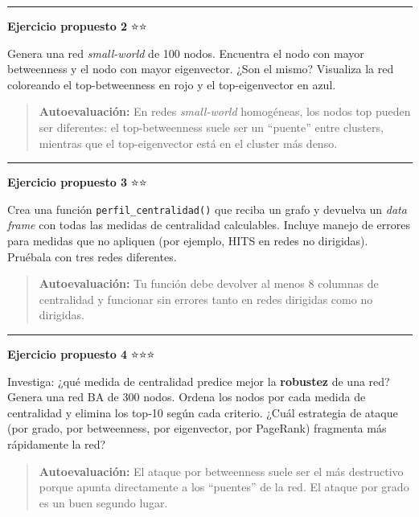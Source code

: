 \documentclass[
  letterpaper,
  DIV=11,
  numbers=noendperiod]{scrreprt}
\begin{document}
\begin{center}\rule{0.5\linewidth}{0.5pt}\end{center}

\textbf{Ejercicio propuesto 2} ⭐⭐

Genera una red \emph{small-world} de 100 nodos. Encuentra el nodo con
mayor betweenness y el nodo con mayor eigenvector. ¿Son el mismo?
Visualiza la red coloreando el top-betweenness en rojo y el
top-eigenvector en azul.

\begin{quote}
\textbf{Autoevaluación:} En redes \emph{small-world} homogéneas, los
nodos top pueden ser diferentes: el top-betweenness suele ser un
``puente'' entre clusters, mientras que el top-eigenvector está en el
cluster más denso.
\end{quote}

\begin{center}\rule{0.5\linewidth}{0.5pt}\end{center}

\textbf{Ejercicio propuesto 3} ⭐⭐

Crea una función \texttt{perfil\_centralidad()} que reciba un grafo y
devuelva un \emph{data frame} con todas las medidas de centralidad
calculables. Incluye manejo de errores para medidas que no apliquen (por
ejemplo, HITS en redes no dirigidas). Pruébala con tres redes
diferentes.

\begin{quote}
\textbf{Autoevaluación:} Tu función debe devolver al menos 8 columnas de
centralidad y funcionar sin errores tanto en redes dirigidas como no
dirigidas.
\end{quote}

\begin{center}\rule{0.5\linewidth}{0.5pt}\end{center}

\textbf{Ejercicio propuesto 4} ⭐⭐⭐

Investiga: ¿qué medida de centralidad predice mejor la \textbf{robustez}
de una red? Genera una red BA de 300 nodos. Ordena los nodos por cada
medida de centralidad y elimina los top-10 según cada criterio. ¿Cuál
estrategia de ataque (por grado, por betweenness, por eigenvector, por
PageRank) fragmenta más rápidamente la red?

\begin{quote}
\textbf{Autoevaluación:} El ataque por betweenness suele ser el más
destructivo porque apunta directamente a los ``puentes'' de la red. El
ataque por grado es un buen segundo lugar.
\end{quote}
\end{document}
